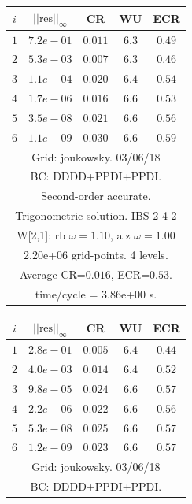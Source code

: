 \begin{table}[hbt]
\begin{center}
{\tablefontsize
\begin{tabular}{|c|c|c|c|c|} \hline 
 $i$   & $\vert\vert\mbox{res}\vert\vert_\infty$  &  CR     &  WU    & ECR  \\   \hline 
 $ 1$  & $ 7.2e-01$ & $0.011$ & $ 6.3$ & $0.49$ \\ 
 $ 2$  & $ 5.3e-03$ & $0.007$ & $ 6.3$ & $0.46$ \\ 
 $ 3$  & $ 1.1e-04$ & $0.020$ & $ 6.4$ & $0.54$ \\ 
 $ 4$  & $ 1.7e-06$ & $0.016$ & $ 6.6$ & $0.53$ \\ 
 $ 5$  & $ 3.5e-08$ & $0.021$ & $ 6.6$ & $0.56$ \\ 
 $ 6$  & $ 1.1e-09$ & $0.030$ & $ 6.6$ & $0.59$ \\ 
\hline 
\multicolumn{5}{|c|}{Grid: joukowsky. 03/06/18}  \\
\multicolumn{5}{|c|}{BC: DDDD+PPDI+PPDI.}  \\
\multicolumn{5}{|c|}{Second-order accurate.}  \\
\multicolumn{5}{|c|}{Trigonometric solution. IBS-2-4-2}  \\
\multicolumn{5}{|c|}{W[2,1]: rb $\omega=1.10$, alz $\omega=1.00$}  \\
\multicolumn{5}{|c|}{2.20e+06 grid-points. 4 levels.}  \\
\multicolumn{5}{|c|}{Average CR=$0.016$, ECR=$0.53$.}  \\
\multicolumn{5}{|c|}{time/cycle = 3.86e+00 s.}  \\
\hline 
\end{tabular}
\begin{tabular}{|c|c|c|c|c|} \hline 
 $i$   & $\vert\vert\mbox{res}\vert\vert_\infty$  &  CR     &  WU    & ECR  \\   \hline 
 $ 1$  & $ 2.8e-01$ & $0.005$ & $ 6.4$ & $0.44$ \\ 
 $ 2$  & $ 4.0e-03$ & $0.014$ & $ 6.4$ & $0.52$ \\ 
 $ 3$  & $ 9.8e-05$ & $0.024$ & $ 6.6$ & $0.57$ \\ 
 $ 4$  & $ 2.2e-06$ & $0.022$ & $ 6.6$ & $0.56$ \\ 
 $ 5$  & $ 5.3e-08$ & $0.025$ & $ 6.6$ & $0.57$ \\ 
 $ 6$  & $ 1.2e-09$ & $0.023$ & $ 6.6$ & $0.57$ \\ 
\hline 
\multicolumn{5}{|c|}{Grid: joukowsky. 03/06/18}  \\
\multicolumn{5}{|c|}{BC: DDDD+PPDI+PPDI.}  \\

\end{tabular}}
\end{center}
\end{table}
